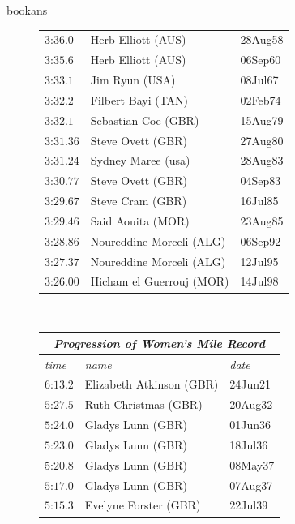 \begin{exercises}
\begin{Filesave}{bookans}
\begin{figure}
{{\begin{tabular}[t]{|l|ll|}
         $\text{3:36}.0$   &Herb Elliott (AUS)     &28Aug58  \\
         $\text{3:35}.6$   &Herb Elliott (AUS)     &06Sep60  \\
         $\text{3:33}.1$   &Jim Ryun (USA)         &08Jul67  \\
         $\text{3:32}.2$   &Filbert Bayi (TAN)     &02Feb74  \\
         $\text{3:32}.1$   &Sebastian Coe (GBR)    &15Aug79  \\
         $\text{3:31}.36$  &Steve Ovett (GBR)      &27Aug80  \\
         $\text{3:31}.24$  &Sydney Maree (usa)     &28Aug83  \\
         $\text{3:30}.77$  &Steve Ovett (GBR)      &04Sep83  \\
         $\text{3:29}.67$  &Steve Cram (GBR)       &16Jul85  \\
         $\text{3:29}.46$  &Said Aouita (MOR)      &23Aug85  \\ 
         $\text{3:28}.86$  &Noureddine Morceli (ALG)  &06Sep92  \\
         $\text{3:27}.37$  &Noureddine Morceli (ALG)  &12Jul95  \\
         $\text{3:26}.00$  &Hicham el Guerrouj (MOR)  &14Jul98  \\
     \hline
     \end{tabular}
      \   %
        \begin{tabular}[t]{|l|ll|}
        \hline
          \multicolumn{3}{|c|}{\textit{Progression of Women's Mile Record}}  \\
        \hline
        \textit{time}  &\textit{name}  &\textit{date}  \\
         \hline  
           $\text{6:13}.2$    &Elizabeth Atkinson (GBR)    &24Jun21 \\
           $\text{5:27}.5$    &Ruth Christmas (GBR)        &20Aug32 \\
           $\text{5:24}.0$    &Gladys Lunn (GBR)           &01Jun36 \\
           $\text{5:23}.0$    &Gladys Lunn (GBR)           &18Jul36 \\
           $\text{5:20}.8$    &Gladys Lunn (GBR)           &08May37 \\
           $\text{5:17}.0$    &Gladys Lunn (GBR)           &07Aug37 \\
           $\text{5:15}.3$    &Evelyne Forster (GBR)       &22Jul39 \\

\end{tabular}}}
\end{figure}
\end{Filesave}
\end{exercises}
